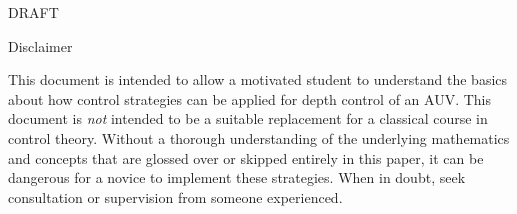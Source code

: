 \documentclass{article}
\begin{document}
\maketitle

\begin{center}
\Huge 
DRAFT
\normalsize
\end{center}
\vspace{4cm}

Disclaimer

This document is intended to allow a motivated student to understand the basics about how control strategies can be applied for depth control of an AUV.  This document is \emph{not} intended to be a suitable replacement for a classical course in control theory.  Without a thorough understanding of the underlying mathematics and concepts that are glossed over or skipped entirely in this paper, it can be dangerous for a novice to implement these strategies.  When in doubt, seek consultation or supervision from someone experienced.

\newpage


\end{document}
